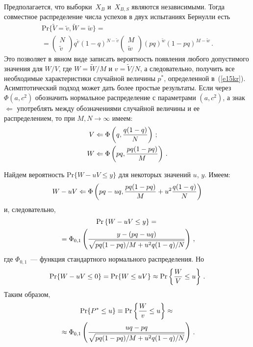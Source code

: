 \begin{multicols}{2}
  
Предполагается, что выборки~$X_B$ и~$X_{B,S}$ являются 
независимыми. Тогда совместное распределение числа успехов в двух 
испытаниях Бернулли есть
     \begin{multline*}
     \mathrm{Pr}\{\widetilde{V}=\widetilde{v},\widetilde{W}=\widetilde{w}\}={}\\
     {}= 
     \begin{pmatrix}
     N\\
     \widetilde{v}
     \end{pmatrix} q^{\widetilde{v}}\left (1-q\right ) ^{N-\widetilde{v}}
     \begin{pmatrix}
     M\\ \widetilde{w}
     \end{pmatrix}
     \left ( pq\right )^{\widetilde{w}}\left (1-pq\right )^{M-\widetilde{w}}\,.
     \end{multline*}
Это позволяет в явном виде записать вероятность появления любого допустимого 
значения для $W/V$, где $W = \widetilde{W}/M$ и $v=\widetilde{V}/N$, а 
следовательно, получить все необходимые характеристики случайной величины 
$p^*$, определенной в~(\ref{e15kr}). Асимптотический подход может дать 
более простые результаты. Если через $\Phi (a,c^2)$ обозначить нормальное 
распределение с параметрами $(a,c^2)$, а знак $\Leftarrow$ упо\-треб\-лять между 
обозначениями случайной величины и ее распределением, то при $M,N\rightarrow 
\infty$ имеем: 
\begin{align*}
V & \Leftarrow \Phi\left (q, \displaystyle\frac{\displaystyle q(1-q)\mathstrut}{\displaystyle N\mathstrut}\right )\,;\\
W & \Leftarrow \Phi\left ( pq, \displaystyle\frac{\displaystyle pq(1-pq)\mathstrut}{\displaystyle M\mathstrut}\right )\,.
\end{align*} 
     
     Найдем вероятность $\mathrm{Pr}\{W-uV\leq y\}$ для некоторых значений 
$u$,  $y$. Имеем: 
     $$
     W-uV\Leftarrow \Phi\left ( pq-uq,\displaystyle\frac{\displaystyle pq(1-pq)\mathstrut}{\displaystyle M\mathstrut}+u^2\displaystyle\frac{\displaystyle q(1-q)\mathstrut}{\displaystyle N\mathstrut}\right )
     $$
     и, следовательно, 
     \begin{multline*}
     \mathrm{Pr} \left \{ W-uV\leq y\right \} ={}\\
     {}= \Phi_{0,1}\left ( \displaystyle\frac{\displaystyle y-(pq-
uq)\mathstrut}{\displaystyle \sqrt{pq(1-pq)/M+u^2q(1-q)/N}\mathstrut}\right )\,,
     \end{multline*}
где $\Phi_{0,1}$~--- функция стандартного нормального распределения. Но
$$
\mathrm{Pr}\{W-uV\leq 0\} = \mathrm{Pr}\{W\leq uV\}\approx \mathrm{Pr}\left 
\{\displaystyle\frac{\displaystyle W\mathstrut}{\displaystyle V\mathstrut}\leq u\right \}\,.
$$
Таким образом,
\begin{multline}
\mathrm{Pr}\{P^*\leq u\} \equiv \mathrm{Pr}\left \{\displaystyle\frac{\displaystyle W\mathstrut}{\displaystyle v\mathstrut}\leq u\right 
\}\approx{}\\
{}\approx \Phi_{0,1}\left ( \displaystyle\frac{\displaystyle uq-pq\mathstrut}{\displaystyle \sqrt{pq(1-pq)/M+u^2q(1-
q)/N}\mathstrut}\right )\,.
\label{e16kr}
\end{multline}


\end{multicols}
